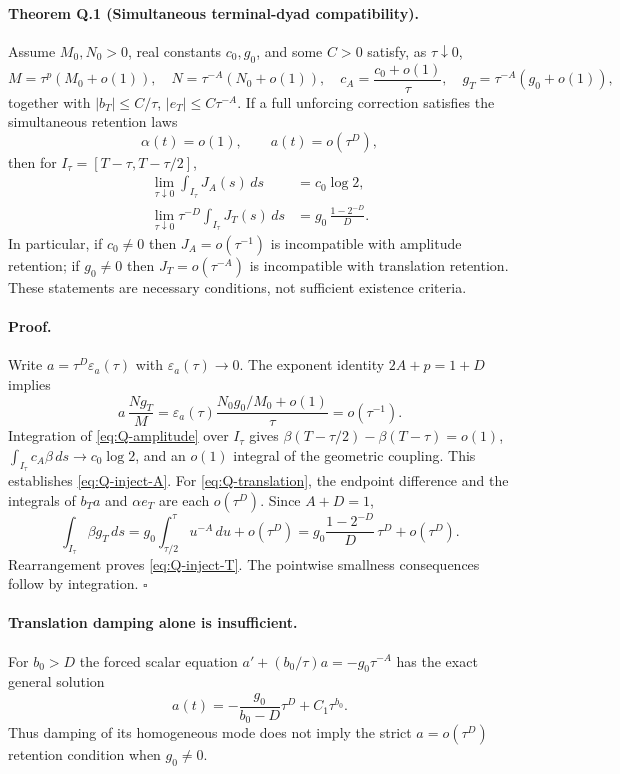 \paragraph{Theorem Q.1 (Simultaneous terminal-dyad compatibility).}
Assume $M_0,N_0>0$, real constants $c_0,g_0$, and some $C>0$
satisfy, as $\tau\downarrow0$,
\[
 M=\tau^p(M_0+o(1)),\quad N=\tau^{-A}(N_0+o(1)),\quad
 c_A=\frac{c_0+o(1)}{\tau},\quad
 g_T=\tau^{-A}(g_0+o(1)),
\]
together with $|b_T|\le C/\tau$, $|e_T|\le C\tau^{-A}$.
If a full unforcing correction satisfies the simultaneous retention laws
\[
 \alpha(t)=o(1),\qquad a(t)=o(\tau^D),
\]
then for $I_\tau=[T-\tau,T-\tau/2]$,
\begin{align}
 \lim_{\tau\downarrow0}\int_{I_\tau}J_A(s)\,ds
   &=c_0\log2,\label{eq:Q-inject-A}\\
 \lim_{\tau\downarrow0}\tau^{-D}\int_{I_\tau}J_T(s)\,ds
   &=g_0\,\frac{1-2^{-D}}{D}.
   \label{eq:Q-inject-T}
\end{align}
In particular, if $c_0\ne0$ then $J_A=o(\tau^{-1})$ is
incompatible with amplitude retention; if $g_0\ne0$ then
$J_T=o(\tau^{-A})$ is incompatible with translation retention.
These statements are necessary conditions, not sufficient existence criteria.

\paragraph{Proof.}
Write $a=\tau^D\varepsilon_a(\tau)$ with
$\varepsilon_a(\tau)\to0$.
The exponent identity $2A+p=1+D$ implies
\[
 a\,\frac{Ng_T}{M}
  =\varepsilon_a(\tau)
    \frac{N_0g_0/M_0+o(1)}{\tau}=o(\tau^{-1}).
\]
Integration of \eqref{eq:Q-amplitude} over $I_\tau$ gives
$\beta(T-\tau/2)-\beta(T-\tau)=o(1)$,
$\int_{I_\tau}c_A\beta\,ds\to c_0\log2$, and an $o(1)$
integral of the geometric coupling. This establishes
\eqref{eq:Q-inject-A}.
For \eqref{eq:Q-translation}, the endpoint difference and the
integrals of $b_Ta$ and $\alpha e_T$ are each $o(\tau^D)$.
Since $A+D=1$,
\[
 \int_{I_\tau}\beta g_T\,ds
 =g_0\int_{\tau/2}^{\tau}u^{-A}\,du+o(\tau^D)
 =g_0\frac{1-2^{-D}}D\,\tau^D+o(\tau^D).
\]
Rearrangement proves \eqref{eq:Q-inject-T}. The pointwise
smallness consequences follow by integration. \hfill$\square$

\paragraph{Translation damping alone is insufficient.}
For $b_0>D$ the forced scalar equation
$a'+(b_0/\tau)a=-g_0\tau^{-A}$
has the exact general solution
\[
 a(t)=-\frac{g_0}{b_0-D}\tau^D+C_1\tau^{b_0}.
\]
Thus damping of its homogeneous mode does not imply the strict
$a=o(\tau^D)$ retention condition when $g_0\ne0$.

